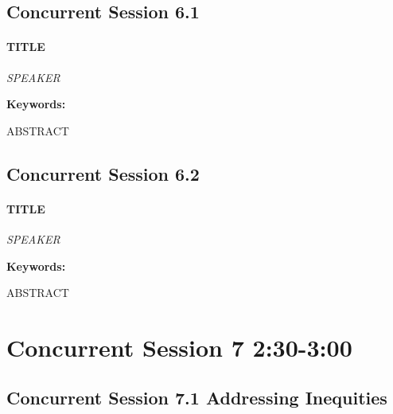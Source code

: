 \documentclass[
]{book}
\begin{document}
\hypertarget{concurrent-session-6.1}{%
\subsection*{Concurrent Session 6.1}\label{concurrent-session-6.1}}

\begin{speaker}
\hypertarget{title}{%
\paragraph{\texorpdfstring{\textbf{TITLE}}{TITLE}}\label{title}}

\emph{SPEAKER}

\textbf{Keywords:}

ABSTRACT
\end{speaker}

\hypertarget{concurrent-session-6.2}{%
\subsection*{Concurrent Session 6.2}\label{concurrent-session-6.2}}

\begin{speaker}
\hypertarget{title}{%
\paragraph{\texorpdfstring{\textbf{TITLE}}{TITLE}}\label{title}}

\emph{SPEAKER}

\textbf{Keywords:}

ABSTRACT
\end{speaker}

\hypertarget{concurrent-session-7-230-300}{%
\section*{Concurrent Session 7 \textbar{} 2:30-3:00}\label{concurrent-session-7-230-300}}

\hypertarget{concurrent-session-7.1-addressing-inequities}{%
\subsection*{Concurrent Session 7.1 \textbar{} Addressing Inequities}\label{concurrent-session-7.1-addressing-inequities}}
\end{document}
